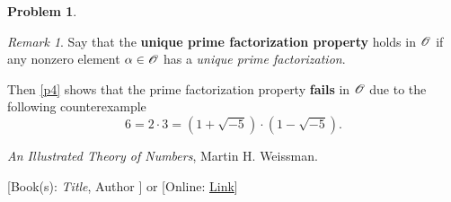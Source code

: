 \documentclass[11pt]{article}
\theoremstyle{plain}
\theoremstyle{definition}
\newtheorem{problem}{Problem}
\theoremstyle{remark}
\newtheorem*{remark}{Remark}
\numberwithin{equation}{problem}
\begin{document}
\begin{problem}
\begin{remark}
		Say that the \textbf{unique prime factorization property} holds in $\mathscr{O}$ if any nonzero element $\alpha\in\mathscr{O}$ has a \emph{unique prime factorization}. 

		Then \cref{p4} shows that the prime factorization property \textbf{fails} in $\mathscr{O}$ due to the following counterexample
		\[
			6 = 2\cdot 3 = (1+\sqrt{-5})\cdot(1-\sqrt{-5}).
		\]
	\end{remark}
\end{problem}


\begin{thebibliography}{9}  %
\emph{An Illustrated Theory of Numbers}, Martin H. Weissman.

[Book(s): \emph{Title}, Author ] or [Online: \href{http://example.com/}{Link}]
\end{thebibliography}  %
\end{document}
